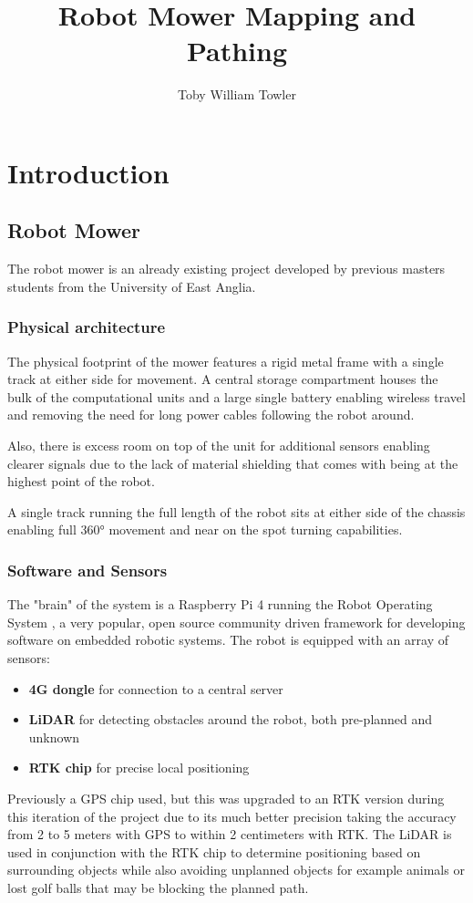 \documentclass[final]{cmpreport_02}
\title{Robot Mower Mapping and Pathing}
\author{Toby William Towler}
\begin{document}
\section{Introduction}

\subsection{Robot Mower}
The robot mower is an already existing project developed by previous masters students from the University of East Anglia.

\subsubsection{Physical architecture}
The physical footprint of the mower features a rigid metal frame with a single track at either side for movement.
A central storage compartment houses the bulk of the computational units and a large single battery enabling wireless travel and removing the need for long power cables following the robot around.

Also, there is excess room on top of the unit for additional sensors enabling clearer signals due to the lack of material shielding that comes with being at the highest point of the robot.

A single track running the full length of the robot sits at either side of the chassis enabling full 360° movement and near on the spot turning capabilities.


\subsubsection{Software and Sensors}
The "brain" of the system is a Raspberry Pi 4 running the Robot Operating System \citep{ros}, a very popular, open source community driven framework for developing software on embedded robotic systems.
The robot is equipped with an array of sensors:
\begin{itemize}
    \item{\textbf{4G dongle} for connection to a central server}
    \item{\textbf{LiDAR} for detecting obstacles around the robot, both pre-planned and unknown}
    \item{\textbf{RTK chip} for precise local positioning}
\end{itemize}

Previously a GPS chip used, but this was upgraded to an RTK \citep{rtk_gps} version during this iteration of the project due to its much better precision taking the accuracy from 2 to 5 meters with GPS to within 2 centimeters with RTK.
The LiDAR is used in conjunction with the RTK chip to determine positioning based on surrounding objects while also avoiding unplanned objects for example animals or lost golf balls that may be blocking the planned path.
\end{document}
